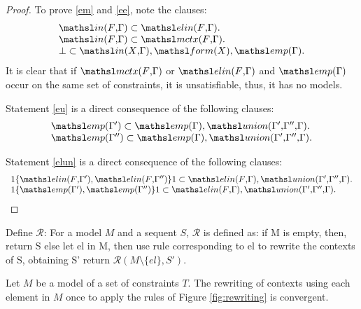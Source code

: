 \begin{proof}
To prove \ref{em} and \ref{ee}, note the clauses:
\[
\begin{array}{l}
  \In{F}{\Gamma} \subset \elin{F}{\Gamma}.\\
  \In{F}{\Gamma} \subset \mctx{F}{\Gamma}.\\
  \bot \subset \In{X}{\Gamma}, \form{X},\emp{\Gamma}.
\end{array}
\]
It is clear that if $\mctx{F}{\Gamma}$ or $\elin{F}{\Gamma}$ and $\emp{\Gamma}$
occur on the same set of constraints, it is unsatisfiable, thus, it has no
models.

Statement \ref{eu} is a direct consequence of the following clauses:
\[
\begin{array}{l}
\emp{\Gamma'} \subset \emp{\Gamma}, \union{\Gamma'}{\Gamma''}{\Gamma}. \\
\emp{\Gamma''} \subset \emp{\Gamma}, \union{\Gamma'}{\Gamma''}{\Gamma}.
\end{array}
\]

Statement \ref{elun} is a direct consequence of the following clauses:
\[
\begin{array}{l}
1 \{ \elin{F}{\Gamma'}, \elin{F}{\Gamma''} \} 1 \subset \elin{F}{\Gamma},
\union{\Gamma'}{\Gamma''}{\Gamma}. \\
1 \{ \emp{\Gamma'}, \emp{\Gamma''} \} 1 \subset \elin{F}{\Gamma},
\union{\Gamma'}{\Gamma''}{\Gamma}.
\end{array}
\]
\end{proof}

\begin{giselle}
Define $\mathcal{R}$:
For a model $M$ and a sequent $S$, $\mathcal{R}$ is defined as:
if M is empty, then, return S
else let el in M, then
  use rule corresponding to el to rewrite the contexts of S, obtaining S'
  return $\mathcal{R}(M \setminus \{el\}, S')$.
\end{giselle}

\begin{lemma}
\label{lemma:convergence}
Let $M$ be a model of a set of constraints $T$. The rewriting of contexts using
each element in $M$ once to apply the rules of Figure \ref{fig:rewriting} is convergent.
\end{lemma}

